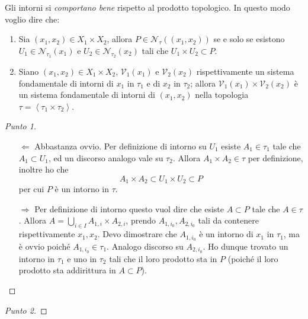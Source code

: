 \begin{theorem}
	Gli intorni si \emph{comportano bene} rispetto al prodotto topologico. In questo modo voglio dire che:
	\begin{enumerate}
		\item Sia $(x_1, x_2) \in X_1\times X_2$, allora $P \in \mathcal{N}_\tau((x_1,x_2))$ se e solo se esistono $U_1 \in \mathcal{N}_{\tau_1}(x_1)$ e $U_2 \in \mathcal{N}_{\tau_2}(x_2)$ tali che $U_1\times U_2 \subset P$.
		\item Siano $(x_1, x_2) \in X_1\times X_2$, $\mathcal{V}_1(x_1)$ e $\mathcal{V}_2(x_2)$ rispettivamente un sistema fondamentale di intorni di $x_1$ in $\tau_1$ e di $x_2$ in $\tau_2$; allora $\mathcal{V}_1(x_1) \times \mathcal{V}_2(x_2)$ è un sistema fondamentale di intorni di $(x_1, x_2)$ nella topologia $\tau = \left\langle \tau_1 \times \tau_2 \right\rangle$.
	\end{enumerate}	
\end{theorem}
\begin{proof}[Punto 1]
	\begin{enumerate}
		\item[$\Leftarrow$] Abbastanza ovvio. Per definizione di intorno su $U_1$ esiste $A_1 \in \tau_1$ tale che $A_1 \subset U_1$, ed un discorso analogo vale su $\tau_2$. Allora $A_1 \times A_2 \in \tau$ per definizione, inoltre ho che 
		\begin{equation*}
			A_1 \times A_2 \subset U_1 \times U_2 \subset P
		\end{equation*}
		per cui $P$ è un intorno in $\tau$.
		\item[$\Rightarrow$] Per definizione di intorno questo vuol dire che esiste $A \subset P$ tale che $A \in \tau$. Allora $A = \bigcup_{i \in I} A_{1,i} \times A_{2,i}$, prendo $A_{1,i_0}, A_{2,i_0}$ tali da contenere rispettivamente $x_1, x_2$. Devo dimostrare che $A_{1,i_0}$ è un intorno di $x_1$ in $\tau_1$, ma è ovvio poiché $A_{1,i_0} \in \tau_1$. Analogo discorso su $A_{2,i_0}$. Ho dunque trovato un intorno in $\tau_1$ e uno in $\tau_2$ tali che il loro prodotto sta in $P$ (poiché il loro prodotto sta addirittura in $A \subset P$).
	\end{enumerate}
\end{proof}
\begin{proof}[Punto 2]
\end{proof}

